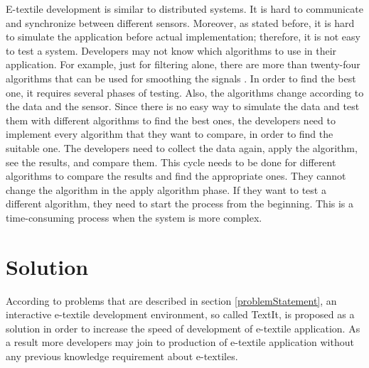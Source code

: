 	E-textile development is similar to distributed systems. It is hard to communicate and synchronize between different sensors. Moreover, as stated before, it is hard to simulate the application before actual implementation; therefore, it is not easy to test a system. Developers may not know which algorithms to use in their application. For example, just for filtering alone, there are more than twenty-four algorithms that can be used for smoothing the signals \cite{10}. In order to find the best one, it requires several phases of testing. Also, the algorithms change according to the data and the sensor. Since there is no easy way to simulate the data and test them with different algorithms to find the best ones, the developers need to implement every algorithm that they want to compare, in order to find the suitable one. The developers need to collect the data again, apply the algorithm, see the results, and compare them. This cycle needs to be done for different algorithms to compare the results and find the appropriate ones. They cannot change the algorithm in the apply algorithm phase. If they want to test a different algorithm, they need to start the process from the beginning. This is a time-consuming process when the system is more complex. 





\section{Solution}

According to problems that are described in section \ref{problemStatement}, an interactive e-textile development environment, so called TextIt, is proposed as a solution in order to increase the speed of development of e-textile application. As a result more developers may join to production of e-textile application without any previous knowledge requirement about e-textiles. \\ 


